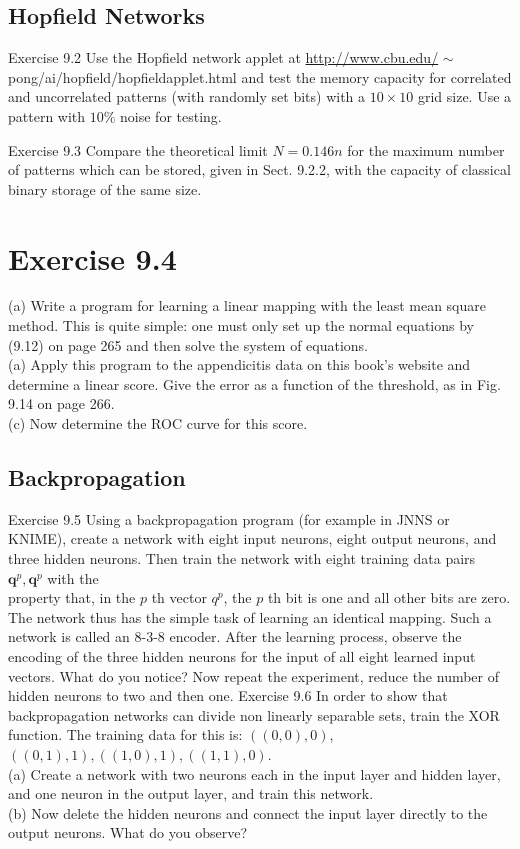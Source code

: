 \documentclass[10pt]{book}
\begin{document}
\subsection{Hopfield Networks}
Exercise 9.2 Use the Hopfield network applet at \href{http://www.cbu.edu/}{http://www.cbu.edu/} $\sim$pong/ai/hopfield/hopfieldapplet.html and test the memory capacity for correlated and uncorrelated patterns (with randomly set bits) with a $10 \times 10$ grid size. Use a pattern with $10\%$ noise for testing.

Exercise 9.3 Compare the theoretical limit $N=0.146 n$ for the maximum number of patterns which can be stored, given in Sect. 9.2.2, with the capacity of classical binary storage of the same size.

\section{Exercise 9.4}
(a) Write a program for learning a linear mapping with the least mean square method. This is quite simple: one must only set up the normal equations by (9.12) on page 265 and then solve the system of equations.\\
(a) Apply this program to the appendicitis data on this book's website and determine a linear score. Give the error as a function of the threshold, as in Fig. 9.14 on page 266.\\
(c) Now determine the ROC curve for this score.

\subsection{Backpropagation}
Exercise 9.5 Using a backpropagation program (for example in JNNS or KNIME), create a network with eight input neurons, eight output neurons, and three hidden neurons. Then train the network with eight training data pairs $\boldsymbol{q}^{p}, \boldsymbol{q}^{p}$ with the\\
property that, in the $p$ th vector $q^{p}$, the $p$ th bit is one and all other bits are zero. The network thus has the simple task of learning an identical mapping. Such a network is called an 8-3-8 encoder. After the learning process, observe the encoding of the three hidden neurons for the input of all eight learned input vectors. What do you notice? Now repeat the experiment, reduce the number of hidden neurons to two and then one.
Exercise 9.6 In order to show that backpropagation networks can divide non linearly separable sets, train the XOR function. The training data for this is: $((0,0), 0)$, $((0,1), 1),((1,0), 1),((1,1), 0)$.\\
(a) Create a network with two neurons each in the input layer and hidden layer, and one neuron in the output layer, and train this network.\\
(b) Now delete the hidden neurons and connect the input layer directly to the output neurons. What do you observe?
\end{document}
